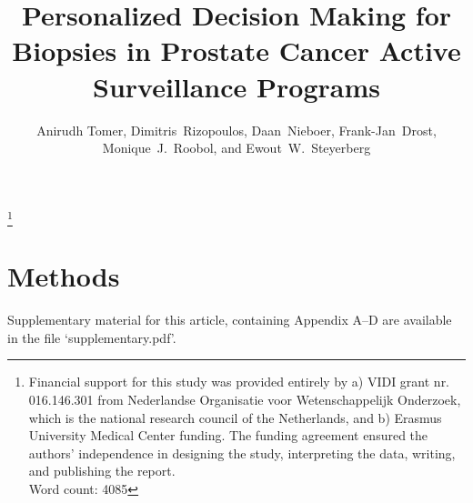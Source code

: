 \documentclass[Review,sagev,times]{sagej}
\begin{document}

\title{Personalized Decision Making for Biopsies in Prostate Cancer Active Surveillance Programs}

\author{Anirudh Tomer, Dimitris~Rizopoulos, Daan~Nieboer, Frank-Jan~Drost, Monique~J.~Roobol, and Ewout~W.~Steyerberg}







\maketitle

\footnote{Financial support for this study was provided entirely by a) VIDI grant nr. 016.146.301 from Nederlandse Organisatie voor Wetenschappelijk Onderzoek, which is the national research council of the Netherlands, and b) Erasmus University Medical Center funding. The funding agreement ensured the authors’ independence in designing the study, interpreting the data, writing, and publishing the report.\\Word count: 4085}
\thefootnote



\section{Methods}
\label{sec:methods}











\begin{sm}
Supplementary material for this article, containing Appendix A--D are available in the file `supplementary.pdf'.
\end{sm} 



\end{document}
